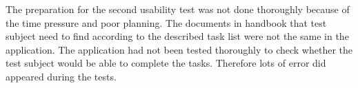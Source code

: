 The preparation for the second usability test was not done thoroughly because of the time pressure and poor planning. 
The documents in handbook that test subject need to find according to the  described task list were not the same in the application. 
The application had not been tested thoroughly to check whether the test subject would be able to complete the tasks. 
Therefore lots of error did appeared during the tests.  




